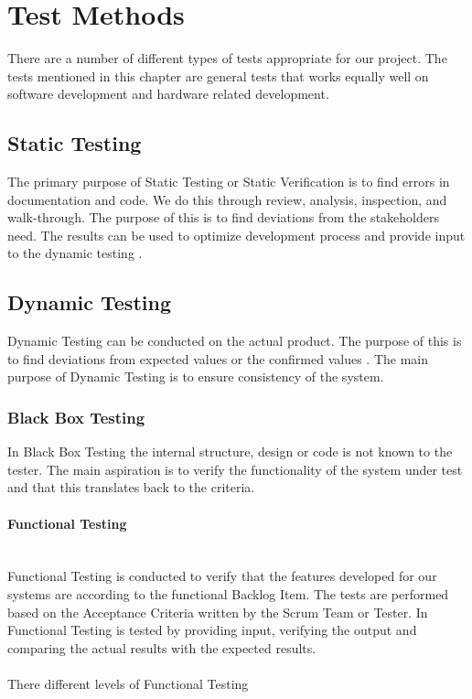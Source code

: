 \section{Test Methods}
There are a number of different types of tests appropriate for our project. The tests mentioned in this chapter are general tests that works equally well on software development and hardware related development. 


\subsection{Static Testing}
The primary purpose of Static Testing or Static Verification is to find errors in documentation and code. We do this through review, analysis, inspection, and walk-through. The purpose of this is to find deviations from the stakeholders need. The results can be used to optimize development process and provide input to the dynamic testing \cite{ref3}. 

\subsection{Dynamic Testing}
Dynamic Testing can be conducted on the actual product. The purpose of this is to find deviations from expected values or the confirmed values \cite{ref3}. The main purpose of Dynamic Testing is to ensure consistency of the system.

\subsubsection{Black Box Testing}
In Black Box Testing the internal structure, design or code is not known to the tester. The main aspiration is to verify the functionality of the system under test and that this translates back to the criteria. 


\paragraph{Functional Testing} \\
Functional Testing is conducted to verify that the features developed for our systems are according to the functional Backlog Item. The tests are performed based on the Acceptance Criteria written by the Scrum Team or Tester. In Functional Testing is tested by providing input, verifying the output and comparing the actual results with the expected results.\\
\\
There different levels of Functional Testing 

